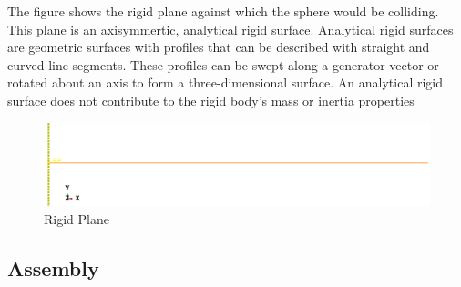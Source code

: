 The figure shows the rigid plane against which the sphere would be colliding. This plane is an axisymmertic, analytical rigid surface.
Analytical rigid surfaces are geometric surfaces with profiles that can be described with straight and curved line segments. These profiles can be swept along a generator vector or rotated about an axis to form a three-dimensional surface. An analytical rigid surface does not contribute to the rigid body's mass or inertia properties 

\begin{figure}[H]
    \centering
	\includegraphics[scale=0.5]{../images/SimulationSetup/Plane.eps}
	\caption{Rigid Plane}
	\label{fig:plane}
\end{figure}


\subsection{Assembly}

